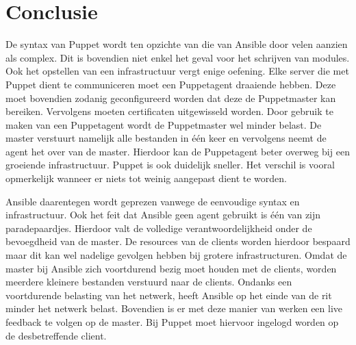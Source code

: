 
\chapter{Conclusie}
\label{ch:conclusie}

 De syntax van Puppet  wordt ten opzichte van die van Ansible door velen aanzien als complex. Dit is bovendien niet enkel het geval voor het schrijven van modules. Ook het opstellen van een infrastructuur vergt enige oefening. Elke server die met Puppet dient te communiceren moet een Puppetagent draaiende hebben. Deze moet bovendien zodanig geconfigureerd worden dat deze de Puppetmaster kan bereiken. Vervolgens moeten certificaten uitgewisseld worden. Door gebruik te maken van een Puppetagent wordt de Puppetmaster wel minder belast. De master verstuurt namelijk alle bestanden in \'e\'en keer en vervolgens neemt de agent het over van de master. Hierdoor kan de Puppetagent beter overweg bij een groeiende infrastructuur. Puppet is ook duidelijk sneller. Het verschil is vooral opmerkelijk wanneer er niets tot weinig aangepast dient te worden. 

Ansible daarentegen wordt geprezen vanwege de eenvoudige syntax en infrastructuur. Ook het feit dat Ansible geen agent gebruikt is \'e\'en van zijn paradepaardjes. Hierdoor valt de volledige verantwoordelijkheid onder de bevoegdheid van de master. De resources van de clients worden hierdoor bespaard maar dit kan wel nadelige gevolgen hebben bij grotere infrastructuren. Omdat de master bij Ansible zich voortdurend bezig moet houden met de clients, worden meerdere kleinere bestanden verstuurd naar de clients. Ondanks een voortdurende belasting van het netwerk, heeft Ansible op het einde van de rit minder het netwerk belast. Bovendien is er met deze manier van werken een live feedback te volgen op de master. Bij Puppet moet hiervoor ingelogd worden op de desbetreffende client.





